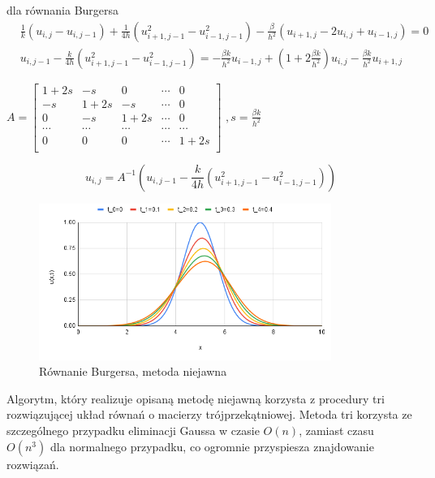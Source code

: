 \documentclass[a4paper,12pt]{article}
\begin{document}
	dla równania Burgersa
	\begin{equation}
		\begin{split}
			& \frac{1}{k}(u_{i,j}-u_{i,j-1})+\frac{1}{4h}(u_{i+1,j-1}^{2}-u_{i-1,j-1}^{2})-\frac{\beta}{h^{2}}(u_{i+1,j}-2u_{i,j}+u_{i-1,j})=0\\
			& u_{i,j-1}-\frac{k}{4h}(u_{i+1,j-1}^{2}-u_{i-1,j-1}^{2})=-\frac{\beta k}{h^{2}}u_{i-1,j}+(1+2\frac{\beta k}{h^{2}})u_{i,j}-\frac{\beta k}{h^{2}}u_{i+1,j}
		\end{split}
	\end{equation}
	\begin{center}
		$A=
		\begin{bmatrix}
			1+2s & -s & 0 & \cdots & 0\\
			-s & 1+2s & -s & \cdots & 0\\
			0 & -s & 1+2s & \cdots & 0\\
			\cdots & \cdots & \cdots & \cdots & \cdots\\
			0 & 0 & 0 & \cdots & 1+2s\\
		\end{bmatrix}$
		$,s=\frac{\beta k}{h^{2}}$
	\end{center}
	\begin{equation}
		u_{i,j}=A^{-1}(u_{i,j-1}-\frac{k}{4h}(u_{i+1,j-1}^{2}-u_{i-1,j-1}^{2}))
	\end{equation}
	\begin{figure}[h]
		\caption{Równanie Burgersa, metoda niejawna}
		\centering
		\includegraphics[width=0.85\textwidth]{rys/9.png}
	\end{figure}
	\newline
	Algorytm, który realizuje opisaną metodę niejawną korzysta z procedury tri rozwiązującej układ równań o macierzy trójprzekątniowej. Metoda tri korzysta ze szczególnego przypadku eliminacji Gaussa w czasie $O(n)$, zamiast czasu $O(n^3)$ dla normalnego przypadku, co ogromnie przyspiesza znajdowanie rozwiązań.
	\newpage
	
\end{document}

